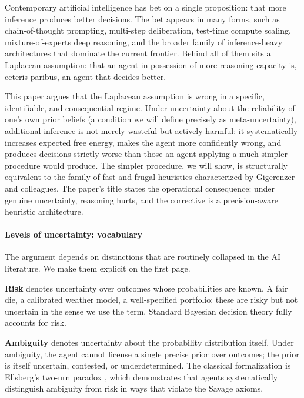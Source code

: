 \documentclass{article}
\begin{document}
Contemporary artificial intelligence has bet on a single proposition:
that more inference produces better decisions. The bet appears in many
forms, such as chain-of-thought prompting, multi-step deliberation,
test-time compute scaling, mixture-of-experts deep reasoning, and the
broader family of inference-heavy architectures that dominate the
current frontier. Behind all of them sits a Laplacean assumption: that
an agent in possession of more reasoning capacity is, ceteris paribus,
an agent that decides better.

This paper argues that the Laplacean assumption is wrong in a specific,
identifiable, and consequential regime. Under uncertainty about the
reliability of one's own prior beliefs (a condition we will define
precisely as meta-uncertainty), additional inference is not merely
wasteful but actively harmful: it systematically increases expected free
energy, makes the agent more confidently wrong, and produces decisions
strictly worse than those an agent applying a much simpler procedure
would produce. The simpler procedure, we will show, is structurally
equivalent to the family of fast-and-frugal heuristics characterized by
Gigerenzer and colleagues. The paper's title states the operational
consequence: under genuine uncertainty, reasoning hurts, and the
corrective is a precision-aware heuristic architecture.

\paragraph{Levels of uncertainty:
vocabulary}\label{levels-of-uncertainty-vocabulary}

The argument depends on distinctions that are routinely collapsed in the
AI literature. We make them explicit on the first page.

\textbf{Risk} denotes uncertainty over outcomes whose probabilities are
known. A fair die, a calibrated weather model, a well-specified
portfolio: these are risky but not uncertain in the sense we use the
term. Standard Bayesian decision theory fully accounts for risk.

\textbf{Ambiguity} denotes uncertainty about the probability
distribution itself. Under ambiguity, the agent cannot license a single
precise prior over outcomes; the prior is itself uncertain, contested,
or underdetermined. The classical formalization is Ellsberg's two-urn
paradox \cite{ellsberg1961}, which demonstrates that agents systematically
distinguish ambiguity from risk in ways that violate the Savage axioms.
\end{document}

